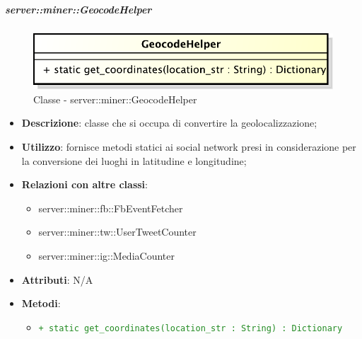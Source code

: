 		\subparagraph{server::miner::GeocodeHelper} %
		\label{subp:server_miner_GeocodeHelper}
		  	 	\begin{figure}[!htbp]
 		 			\centering
 					\centerline{\includegraphics[scale=0.75]{./images/server/classes/miner/geocode_helper.pdf}}
 					\caption{Classe - server::miner::GeocodeHelper}
				\end{figure}
				\begin{itemize}
				\item \textbf{Descrizione}: classe che si occupa di convertire la geolocalizzazione;
				\item \textbf{Utilizzo}: fornisce metodi statici ai social network presi in considerazione per la conversione dei luoghi in latitudine e longitudine;
				\item \textbf{Relazioni con altre classi}:
					\begin{itemize}
						\item server::miner::fb::FbEventFetcher
						\item server::miner::tw::UserTweetCounter
						\item server::miner::ig::MediaCounter
					\end{itemize}
				\item \textbf{Attributi}: N/A
				\item \textbf{Metodi}:
					\begin{itemize}
						\item \textcolor{forestgreen}{\texttt{+ static get\_coordinates(location\_str : String) : Dictionary}}
					\end{itemize}
			\end{itemize}

